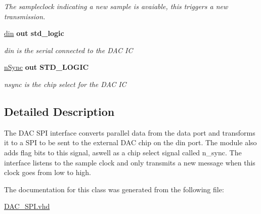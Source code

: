 \begin{DoxyCompactItemize}
\begin{DoxyCompactList}\small\item\em The sampleclock indicating a new sample is avaiable, this triggers a new transmission. \end{DoxyCompactList}\item 
\hypertarget{classDAC__SPI_a85ffcdebe13d1f5ddc75d9dc2718accd}{\hyperlink{classDAC__SPI_a85ffcdebe13d1f5ddc75d9dc2718accd}{din}  {\bfseries {\bfseries \textcolor{vhdlkeyword}{out}\textcolor{vhdlchar}{ }}} {\bfseries \textcolor{comment}{std\-\_\-logic}\textcolor{vhdlchar}{ }} }\label{classDAC__SPI_a85ffcdebe13d1f5ddc75d9dc2718accd}

\begin{DoxyCompactList}\small\item\em din is the serial connected to the D\-A\-C I\-C \end{DoxyCompactList}\item 
\hypertarget{classDAC__SPI_acb508fc1279abe4c1bc2be47e4dd526b}{\hyperlink{classDAC__SPI_acb508fc1279abe4c1bc2be47e4dd526b}{n\-Sync}  {\bfseries {\bfseries \textcolor{vhdlkeyword}{out}\textcolor{vhdlchar}{ }}} {\bfseries \textcolor{comment}{S\-T\-D\-\_\-\-L\-O\-G\-I\-C}\textcolor{vhdlchar}{ }} }\label{classDAC__SPI_acb508fc1279abe4c1bc2be47e4dd526b}

\begin{DoxyCompactList}\small\item\em nsync is the chip select for the D\-A\-C I\-C \end{DoxyCompactList}\end{DoxyCompactItemize}


\subsection{Detailed Description}
The D\-A\-C S\-P\-I interface converts parallel data from the data port and transforms it to a S\-P\-I to be sent to the external D\-A\-C chip on the din port. The module also adds flag bits to this signal, aswell as a chip select signal called n\-\_\-sync. The interface listens to the sample clock and only transmits a new message when this clock goes from low to high. 

The documentation for this class was generated from the following file\-:\begin{DoxyCompactItemize}
\item 
\hyperlink{DAC__SPI_8vhd}{D\-A\-C\-\_\-\-S\-P\-I.\-vhd}\end{DoxyCompactItemize}
